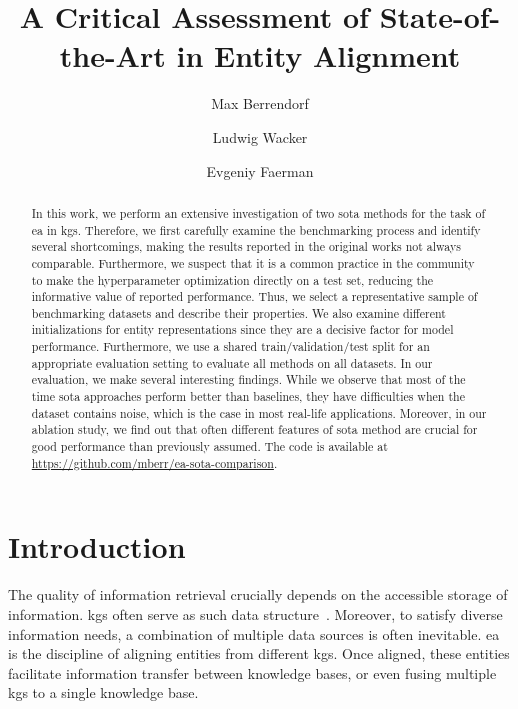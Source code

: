 \documentclass[runningheads]{llncs}
\begin{document}
\title{
A Critical Assessment of State-of-the-Art in Entity Alignment
}
\author{
Max Berrendorf
\and
Ludwig Wacker\and
Evgeniy Faerman}
\maketitle              \begin{abstract}
In this work, we perform an extensive investigation of two \gls{sota} methods for the task of \acrlong{ea} in \acrlong{kg}s.
Therefore, we first carefully examine the benchmarking process and identify several shortcomings, making the results reported in the original works not always comparable. 
Furthermore, we suspect that it is a common practice in the community to make the hyperparameter optimization directly on a test set, reducing the informative value of reported performance.
Thus, we select a representative sample of benchmarking datasets and describe their properties.
We also examine different initializations for entity representations since they are a decisive factor for model performance. 
Furthermore, we use a shared train/validation/test split for an appropriate evaluation setting to evaluate all methods on all datasets.
In our evaluation, we make several interesting findings.
While we observe that most of the time \gls{sota} approaches perform better than baselines, they have difficulties when the dataset contains noise, which is the case in most real-life applications. Moreover, in our ablation study,  we find out that often different features of \gls{sota} method are crucial for good performance than previously assumed.
The code is available at \url{https://github.com/mberr/ea-sota-comparison}.
\end{abstract}


\section{Introduction}
The quality of information retrieval crucially depends on the accessible storage of information.
\glspl{kg} often serve as such data structure~\cite{Dietz2019}.
Moreover, to satisfy diverse information needs, a combination of multiple data sources is often inevitable.
\gls{ea}~\cite{DBLP:conf/ecir/BerrendorfFMT020} is the discipline of aligning entities from different \glspl{kg}.
Once aligned, these entities facilitate information transfer between knowledge bases, or even fusing multiple \glspl{kg} to a single knowledge base.
\end{document}
